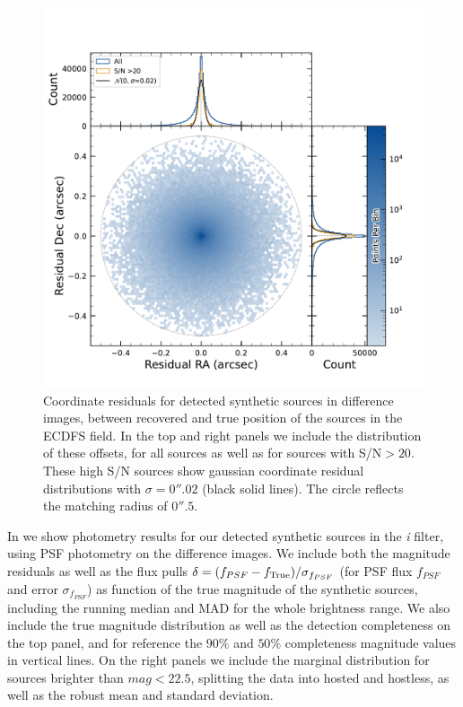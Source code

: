 \begin{figure}[htb!]
\centering
\includegraphics[trim={0 0 0 0},width=\linewidth]{figures/coordinate_offsets_hexbin.pdf}
\caption{Coordinate residuals for detected synthetic sources in difference images, between recovered and true position of the sources in the \gls{ECDFS} field. In the top and right panels we include the distribution of these offsets, for all sources as well as for sources with S/N$>20$. These high S/N sources show gaussian coordinate residual distributions with $\sigma=0''.02$ (black solid lines). The circle reflects the matching radius of $0''.5$.}
\label{fig:coordinate_offset_diffim_fakes}
\end{figure}
%
In  we show photometry results for our detected synthetic sources in the \textit{i} filter, using \gls{PSF} photometry on the difference images. We include both the magnitude residuals as well as the \gls{flux} pulls $\delta = (f_{PSF}-f_{\rm{True}})/\sigma_{f_{PSF}}$ (for PSF \gls{flux} $f_{PSF}$ and error $\sigma_{f_{PSF}}$) as function of the true magnitude of the synthetic sources, including the running median and MAD for the whole brightness range. We also include the true magnitude distribution as well as the detection completeness on the top panel, and for reference the $90\%$ and $50\%$ completeness magnitude values in vertical lines. On the right panels we include the marginal distribution for sources brighter than $mag < 22.5$, splitting the data into hosted and hostless, as well as the robust mean and standard deviation.
